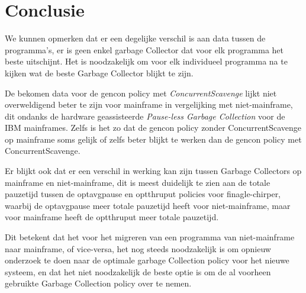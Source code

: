 
\chapter{Conclusie}%
\label{ch:conclusie}






We kunnen opmerken dat er een degelijke verschil is aan data tussen de programma's, er is geen enkel garbage Collector dat voor elk programma het beste uitschijnt.
Het is noodzakelijk om voor elk individueel programma na te kijken wat de beste Garbage Collector blijkt te zijn.


De bekomen data voor de gencon policy met \textit{ConcurrentScavenge} lijkt niet overweldigend beter te zijn voor mainframe in vergelijking met niet-mainframe, dit ondanks de hardware geassisteerde \textit{Pause-less Garbage Collection} voor de IBM mainframes.
Zelfs is het zo dat de gencon policy zonder ConcurrentScavenge op mainframe soms gelijk of zelfs beter blijkt te werken dan de gencon policy met ConcurrentScavenge.



Er blijkt ook dat er een verschil in werking kan zijn tussen Garbage Collectors op mainframe en niet-mainframe, dit is meest duidelijk te zien aan de totale pauzetijd tussen de optavgpause en optthruput policies voor finagle-chirper, waarbij de optavgpause meer totale pauzetijd heeft voor niet-mainframe, maar voor mainframe heeft de optthruput meer totale pauzetijd.

Dit betekent dat het voor het migreren van een programma van niet-mainframe naar mainframe, of vice-versa, het nog steeds noodzakelijk is om opnieuw onderzoek te doen naar de optimale garbage Collection policy voor het nieuwe systeem, en dat het niet noodzakelijk de beste optie is om de al voorheen gebruikte Garbage Collection policy over te nemen.


